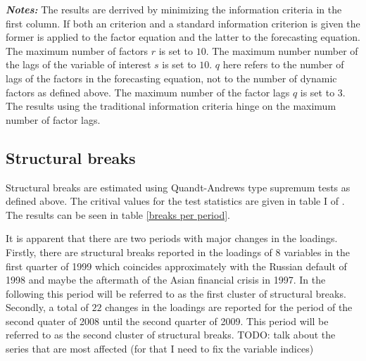 \documentclass[11pt]{article}
\begin{document}
\begin{table}[ht]
	\begin{minipage}{15cm}
		\small{\textbf{\textit{Notes:}} The results are derrived by minimizing the information criteria in the first column. If both an \citet{bai2002determining} criterion and a standard information criterion is given the former is applied to the factor equation and the latter to the forecasting equation. The maximum number of factors $r$ is set to $10$. The maximum number number of the lags of the variable of interest $s$ is set to $10$. $q$ here refers to the number of lags of the factors in the forecasting equation, not to the number of dynamic factors as defined above. The maximum number of the factor lags $q$ is set to 3. The results using the traditional information criteria hinge on the maximum number of factor lags.}
	\end{minipage}
\end{table}

\subsection{Structural breaks}
Structural breaks are estimated using Quandt-Andrews type supremum tests as defined above. The critival values for the test statistics are given in table I of \citet{andrews2003tests}. The results can be seen in table \ref{breaks per period}. 

It is apparent that there are two periods with major changes in the loadings. Firstly, there are structural breaks reported in the loadings of $8$ variables in the first quarter of 1999 which coincides approximately with the Russian default of 1998 and maybe the aftermath of the Asian financial crisis in 1997. In the following this period will be referred to as the first cluster of structural breaks. Secondly, a total of $22$ changes in the loadings are reported for the period of the second quater of 2008 until the second quarter of 2009. This period will be referred to as the second cluster of structural breaks.
TODO: talk about the series that are most affected (for that I need to fix the variable indices)
\\
\end{document}
